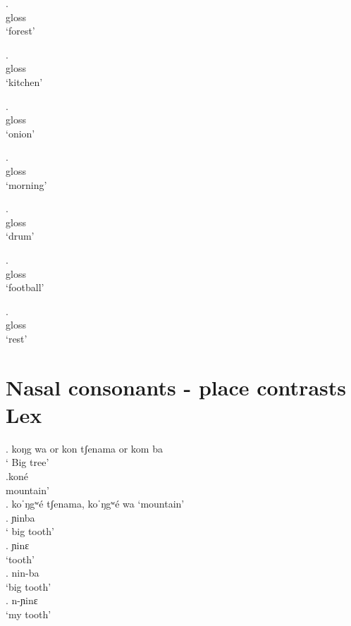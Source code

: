 \documentclass{assets/fieldnotes}
\begin{document}
\exg.  \\
gloss \\
`forest' 

\exg.  \\
gloss \\
`kitchen' 

\exg.  \\
gloss \\
`onion' 

\exg.  \\
gloss \\
`morning' 

\exg.  \\
gloss \\
`drum' 

\exg.  \\
gloss \\
`football' 

\exg.  \\
gloss \\
`rest' 

\section{Nasal consonants - place contrasts Lex} 

\ex. koŋg wa or kon tʃenama or kom ba \\
` Big tree'\\

\ex.koné \\
mountain'\\

\ex. koˈŋgʷé tʃenama, koˈŋgʷé wa %
`mountain'\\

\ex. ɲinba\\
` big tooth'\\

\ex. ɲinɛ\\
`tooth'\\

\ex. nin-ba\\
`big tooth'\\

\ex. n-ɲinɛ\\
`my tooth'\\
\end{document}
